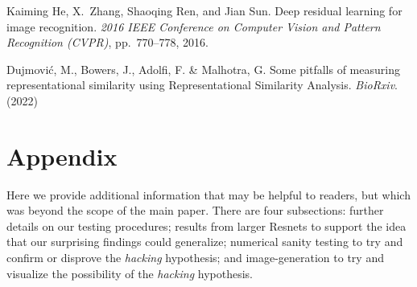 \documentclass{article}
\begin{document}
\begin{thebibliography}{6}
  Kaiming He, X.~Zhang, Shaoqing Ren, and Jian Sun.
  \newblock Deep residual learning for image recognition.
  \newblock \emph{2016 IEEE Conference on Computer Vision and Pattern Recognition
    (CVPR)}, pp.\  770--778, 2016.
  
  Dujmović, M., Bowers, J., Adolfi, F. \& Malhotra, G.
  \newblock Some pitfalls of measuring representational similarity using Representational Similarity Analysis.
  \newblock \emph{ BioRxiv}. (2022)

  \end{thebibliography}
\newpage
\appendix
\section{Appendix}
Here we provide additional information that may be helpful to readers, but which was
beyond the scope of the main paper. There are four subsections: further details on our
testing procedures; results from larger Resnets to support the idea that our surprising findings
could generalize; numerical sanity testing to try and confirm or disprove the \textit{hacking}
hypothesis; and image-generation to try and visualize the possibility of the \textit{hacking}
hypothesis.
\end{document}
